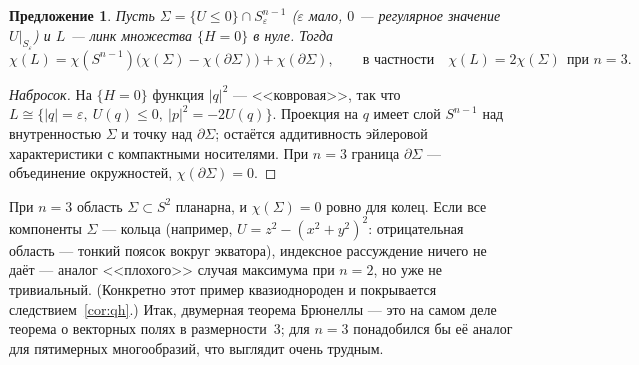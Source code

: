\documentclass[11pt,a4paper]{article}
\newtheorem{proposition}[theorem]{Предложение}
\theoremstyle{definition}
\newcommand{\eps}{\varepsilon}
\begin{document}
\begin{proposition}\label{prop:chi}
Пусть $\Sigma=\{U\le0\}\cap S^{n-1}_\eps$ ($\eps$ мало, $0$ --- регулярное значение $U|_{S_\eps}$) и
$L$ --- линк множества $\{H=0\}$ в нуле. Тогда
\[
\chi(L)=\chi(S^{n-1})\bigl(\chi(\Sigma)-\chi(\partial\Sigma)\bigr)+\chi(\partial\Sigma),
\qquad\text{в частности}\quad \chi(L)=2\chi(\Sigma)\ \ \text{при } n=3 .
\]
\end{proposition}
\begin{proof}[Набросок]
На $\{H=0\}$ функция $|q|^2$ --- <<ковровая>>, так что $L\cong\{|q|=\eps,\ U(q)\le0,\ |p|^2=-2U(q)\}$.
Проекция на $q$ имеет слой $S^{n-1}$ над внутренностью $\Sigma$ и точку над $\partial\Sigma$; остаётся
аддитивность эйлеровой характеристики с компактными носителями. При $n=3$ граница $\partial\Sigma$ ---
объединение окружностей, $\chi(\partial\Sigma)=0$.
\end{proof}
При $n=3$ область $\Sigma\subset S^2$ планарна, и $\chi(\Sigma)=0$ ровно для колец. Если все компоненты
$\Sigma$ --- кольца (например, $U=z^2-(x^2+y^2)^2$: отрицательная область --- тонкий поясок вокруг экватора),
индексное рассуждение ничего не даёт --- аналог <<плохого>> случая максимума при $n=2$, но уже не
тривиальный. (Конкретно этот пример квазиоднороден и покрывается следствием~\ref{cor:qh}.)
Итак, двумерная теорема Брюнеллы --- это на самом деле теорема о векторных полях в размерности~3;
для $n=3$ понадобился бы её аналог для пятимерных многообразий, что выглядит очень трудным.
\end{document}
